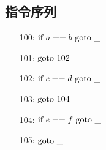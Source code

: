 \documentclass[11pt]{article}
\begin{document}
\subsection*{指令序列}
\begin{itemize}
	\item[100:] $\textup{if\ }a==b\ \textup{goto\ \_}$
	\item[101:] $\textup{goto\ } 102$
	\item[102:] $\textup{if\ }c==d\ \textup{goto\ \_}$
	\item[103:] $\textup{goto\ } 104$
	\item[104:] $\textup{if\ }e==f\ \textup{goto\ \_}$
	\item[105:] $\textup{goto\ \_}$
\end{itemize}
\end{document}
